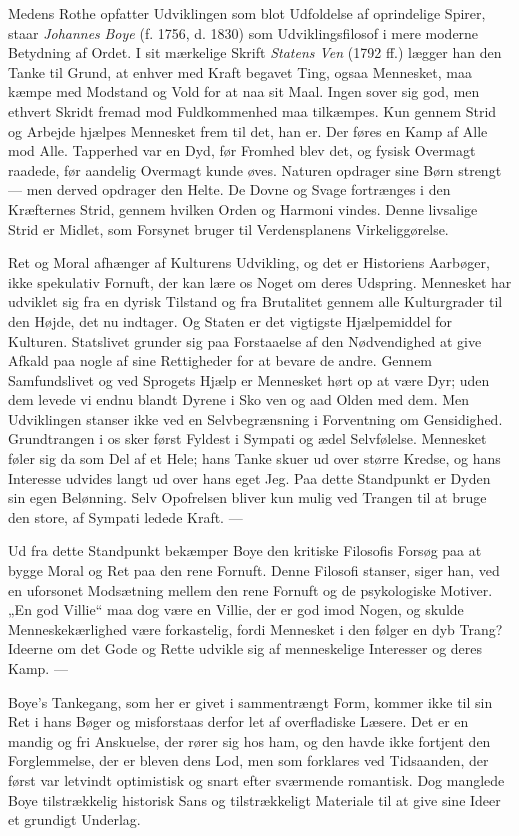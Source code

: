 \documentclass[12pt,a4paper,openany]{book}
\newcommand{\opage}[1]{\marginnote{\footnotesize\textit{[#1]}}}
\begin{document}
Medens Rothe opfatter Udviklingen som blot Udfoldelse af oprindelige Spirer,
staar \emph{Johannes} \emph{Boye} (f. 1756, d. 1830) som Udviklingsfilosof i
mere moderne Betydning af Ordet. I sit mærkelige Skrift \textit{Statens Ven}
(1792 ff.) lægger han den Tanke til Grund, at enhver med Kraft begavet Ting,
ogsaa Mennesket, maa kæmpe med Modstand og Vold for at naa sit Maal. Ingen
sover sig god, men ethvert Skridt fremad mod Fuldkommenhed maa tilkæmpes. Kun
gennem Strid og Arbejde hjælpes Mennesket frem til det, han er. Der føres en
Kamp af Alle mod Alle. Tapperhed var en Dyd, før Fromhed blev det, og fysisk
Overmagt raadede, før aandelig Overmagt kunde øves. Naturen opdrager sine Børn
strengt --- men derved opdrager den Helte. De Dovne og Svage fortrænges i den
Kræfternes Strid, gennem hvilken Orden og Harmoni vindes. Denne livsalige Strid
er Midlet, som Forsynet bruger til Verdensplanens Virkeliggørelse.

Ret og Moral afhænger af Kulturens Udvikling, og det er Historiens Aarbøger,
ikke spekulativ Fornuft, der kan lære os Noget om deres Udspring. Mennesket har
udviklet sig fra en dyrisk Tilstand og fra Brutalitet gennem alle Kulturgrader
til den Højde, det nu indtager. Og Staten er det vigtigste Hjælpemiddel for
Kulturen. Statslivet grunder sig paa Forstaaelse af den Nødvendighed at give
Afkald paa nogle af sine Rettigheder for at bevare de andre. Gennem
Samfundslivet og ved Sprogets Hjælp er Mennesket hørt op at være Dyr; uden dem
levede vi endnu blandt Dyrene i Sko%
\setcounter{footnote}{0}%
\opage{34}ven og aad Olden med dem. Men Udviklingen stanser ikke ved en
Selvbegrænsning i Forventning om Gensidighed. Grundtrangen i os sker først
Fyldest i Sympati og ædel Selvfølelse. Mennesket føler sig da som Del af et
Hele; hans Tanke skuer ud over større Kredse, og hans Interesse udvides langt
ud over hans eget Jeg. Paa dette Standpunkt er Dyden sin egen Belønning. Selv
Opofrelsen bliver kun mulig ved Trangen til at bruge den store, af Sympati
ledede Kraft. ---

Ud fra dette Standpunkt bekæmper Boye den kritiske Filosofis Forsøg paa at
bygge Moral og Ret paa den rene Fornuft. Denne Filosofi stanser, siger han, ved
en uforsonet Modsætning mellem den rene Fornuft og de psykologiske Motiver. „En
god Villie“ maa dog være en Villie, der er god imod Nogen, og skulde
Menneskekærlighed være forkastelig, fordi Mennesket i den følger en dyb Trang?
Ideerne om det Gode og Rette udvikle sig af menneskelige Interesser og deres
Kamp. ---

Boye's Tankegang, som her er givet i sammentrængt Form, kommer ikke til sin Ret
i hans Bøger og misforstaas derfor let af overfladiske Læsere. Det er en mandig
og fri Anskuelse, der rører sig hos ham, og den havde ikke fortjent den
Forglemmelse, der er bleven dens Lod, men som forklares ved Tidsaanden, der
først var letvindt optimistisk og snart efter sværmende romantisk. Dog manglede
Boye tilstrækkelig historisk Sans og tilstrækkeligt Materiale til at give sine
Ideer et grundigt Underlag.
\end{document}
